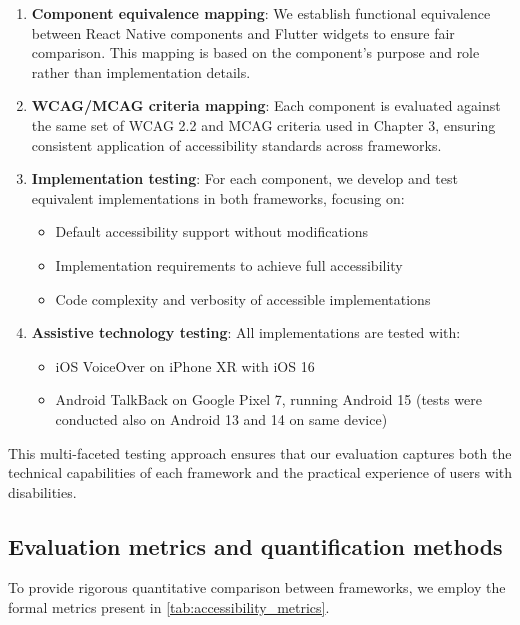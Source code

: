 \begin{enumerate}
    \item \textbf{Component equivalence mapping}: We establish functional equivalence between React Native components and Flutter widgets to ensure fair comparison. This mapping is based on the component's purpose and role rather than implementation details.
    
    \item \textbf{WCAG/MCAG criteria mapping}: Each component is evaluated against the same set of WCAG 2.2 and MCAG criteria used in Chapter 3, ensuring consistent application of accessibility standards across frameworks.
    
    \item \textbf{Implementation testing}: For each component, we develop and test equivalent implementations in both frameworks, focusing on:
    \begin{itemize}
        \item Default accessibility support without modifications
        \item Implementation requirements to achieve full accessibility
        \item Code complexity and verbosity of accessible implementations
    \end{itemize}
    
    \item \textbf{Assistive technology testing}: All implementations are tested with:
    \begin{itemize}
        \item iOS VoiceOver on iPhone XR with iOS 16
        \item Android TalkBack on Google Pixel 7, running Android 15 (tests were conducted also on Android 13 and 14 on same device)
    \end{itemize}
\end{enumerate}

This multi-faceted testing approach ensures that our evaluation captures both the technical capabilities of each framework and the practical experience of users with disabilities.

\subsection{Evaluation metrics and quantification methods}

To provide rigorous quantitative comparison between frameworks, we employ the formal metrics present in \ref{tab:accessibility_metrics}.

